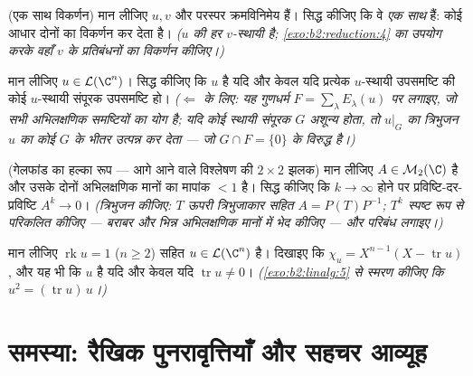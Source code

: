 \begin{exercise}[$\star\star\star$]\label{exo:b2:reduction:9}
(एक साथ विकर्णन) मान लीजिए $u, v$  और परस्पर क्रमविनिमेय हैं।
सिद्ध कीजिए कि वे \emph{एक साथ}  हैं: कोई आधार दोनों का
विकर्णन कर देता है। \emph{($u$ की हर  $v$-स्थायी है;
\cref{exo:b2:reduction:4} का उपयोग करके वहाँ $v$ के प्रतिबंधनों का विकर्णन कीजिए।)}
\end{exercise}

\begin{exercise}[$\star\star\star$]\label{exo:b2:reduction:10}
मान लीजिए $u \in \mathcal{L}(\C^n)$। सिद्ध कीजिए कि $u$  है यदि और केवल यदि
प्रत्येक $u$-स्थायी उपसमष्टि की कोई $u$-स्थायी संपूरक उपसमष्टि हो।
\emph{($\Leftarrow$ के लिए: यह गुणधर्म $F = \sum_\lambda E_\lambda(u)$ पर लगाइए, जो सभी अभिलक्षणिक
समष्टियों का योग है; यदि कोई स्थायी संपूरक $G$ अशून्य होता, तो $u|_G$ का
त्रिभुजन $u$ का कोई  $G$ के भीतर उत्पन्न कर देता --- जो
$G \cap
F = \{0\}$ के विरुद्ध है।)}
\end{exercise}

\begin{exercise}[$\star\star\star$]\label{exo:b2:reduction:11}
(गेलफांड का हल्का रूप --- आगे आने वाले विश्लेषण की $2\times2$ झलक) मान लीजिए
$A \in \mathcal{M}_2(\C)$ है और उसके दोनों अभिलक्षणिक मानों का मापांक $< 1$ है। सिद्ध कीजिए कि
$k \to \infty$ होने पर प्रविष्टि-दर-प्रविष्टि $A^k \to 0$। \emph{(त्रिभुजन कीजिए: $T$
ऊपरी त्रिभुजाकार सहित $A = P(T)P^{-1}$; $T^k$ स्पष्ट रूप से परिकलित कीजिए --- बराबर
और भिन्न अभिलक्षणिक मानों में भेद कीजिए --- और परिबंध लगाइए।)}
\end{exercise}

\begin{exercise}[$\star\star$]\label{exo:b2:reduction:12}
मान लीजिए $\operatorname{rk} u = 1$ ($n
\geq 2$) सहित $u \in \mathcal{L}(\C^n)$ है। दिखाइए कि $\chi_u = X^{n-1}(X - \operatorname{tr} u)$, और यह भी कि $u$
 है यदि और केवल यदि $\operatorname{tr} u
\neq 0$। \emph{(\cref{exo:b2:linalg:5} से स्मरण कीजिए कि $u^2 =
(\operatorname{tr} u)\,u$।)}
\end{exercise}

\section{समस्या: रैखिक पुनरावृत्तियाँ और सहचर आव्यूह}

